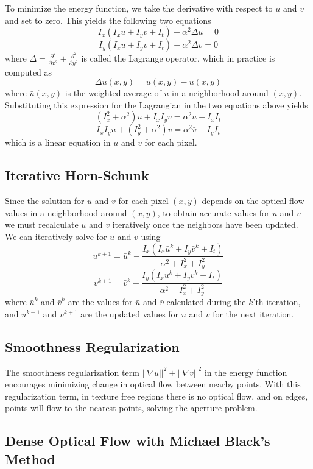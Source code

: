 \documentclass{article}
\begin{document}
To minimize the energy function, we take the derivative with respect to $u$ and $v$ and set to zero. This yields the following two equations
\[I_x(I_xu+I_yv+I_t)-\alpha^2\Delta u=0\]
\[I_y(I_xu+I_yv+I_t)-\alpha^2\Delta v=0\]
where $\Delta=\frac{\partial^2}{\partial x^2}+\frac{\partial^2}{\partial y^2}$ is called the Lagrange operator, which in practice is computed as
\[\Delta u(x,y)=\bar{u}(x,y)-u(x,y)\]
where $\bar{u}(x,y)$ is the weighted average of $u$ in a neighborhood around $(x,y)$. Substituting this expression for the Lagrangian in the two equations above yields
\[(I_x^2+\alpha^2)u+I_xI_yv=\alpha^2\bar{u}-I_xI_t\]
\[I_xI_yu+(I_y^2+\alpha^2)v=\alpha^2\bar{v}-I_yI_t\]
which is a linear equation in $u$ and $v$ for each pixel. 

\subsection{Iterative Horn-Schunk}

Since the solution for $u$ and $v$ for each pixel $(x,y)$ depends on the optical flow values in a neighborhood around $(x,y)$, to obtain accurate values for $u$ and $v$ we must recalculate $u$ and $v$ iteratively once the neighbors have been updated. We can iteratively solve for $u$ and $v$ using
\[u^{k+1}=\bar{u}^k-\frac{I_x(I_x\bar{u}^k+I_y\bar{v}^k+I_t)}{\alpha^2+I_x^2+I_y^2}\]
\[v^{k+1}=\bar{v}^k-\frac{I_y(I_x\bar{u}^k+I_y\bar{v}^k+I_t)}{\alpha^2+I_x^2+I_y^2}\]
where $\bar{u}^k$ and $\bar{v}^k$ are the values for $\bar{u}$ and $\bar{v}$ calculated during the $k$'th iteration, and $u^{k+1}$ and $v^{k+1}$ are the updated values for $u$ and $v$ for the next iteration.

\subsection{Smoothness Regularization}

The smoothness regularization term $||\nabla u||^2+||\nabla v||^2$ in the energy function encourages minimizing change in optical flow between nearby points. With this regularization term, in texture free regions there is no optical flow, and on edges, points will flow to the nearest points, solving the aperture problem.

\subsection{Dense Optical Flow with Michael Black's Method}
\end{document}
